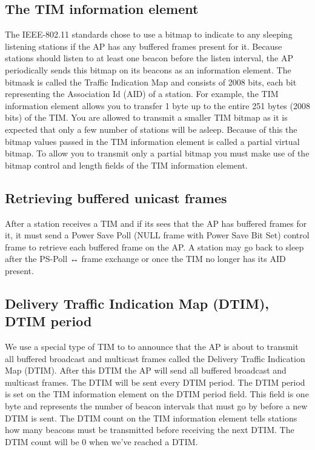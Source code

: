 \subsection{The TIM information element}
\label{sub-sec:proj-timinfoelement}

The IEEE-802.11 standards chose to use a bitmap to indicate to any sleeping listening stations if the AP has any buffered frames present for it. Because stations should listen to at least one beacon before the listen interval, the AP periodically sends this bitmap on its beacons as an information element. The bitmask is called the Traffic Indication Map and consists of 2008 bits, each bit representing the Association Id (AID) of a station. For example, the TIM information element allows you to transfer 1 byte up to the entire 251 bytes (2008 bits) of the TIM. You are allowed to transmit a smaller TIM bitmap as it is expected that only a few number of stations will be asleep. Because of this the bitmap values passed in the TIM information element is called a partial virtual bitmap. To allow you to transmit only a partial bitmap you must make use of the bitmap control and length fields of the TIM information element.

\subsection{Retrieving buffered unicast frames}
\label{sub-sec:proj-buffered}

After a station receives a TIM and if its sees that the AP has buffered frames for it, it must send a Power Save Poll (NULL frame with Power Save Bit Set) control frame to retrieve each buffered frame on the AP. A station may go back to sleep after the PS-Poll ↔ frame exchange or once the TIM no longer has its AID present.

\subsection{Delivery Traffic Indication Map (DTIM), DTIM period}
\label{sub-sec:proj-dtim}

We use a special type of TIM to to announce that the AP is about to transmit all buffered broadcast and multicast frames called the Delivery Traffic Indication Map (DTIM). After this DTIM the AP will send all buffered broadcast and multicast frames. The DTIM will be sent every DTIM period. The DTIM period is set on the TIM information element on the DTIM period field. This field is one byte and represents the number of beacon intervals that must go by before a new DTIM is sent. The DTIM count on the TIM information element tells stations how many beacons must be transmitted before receiving the next DTIM. The DTIM count will be 0 when we've reached a DTIM.

